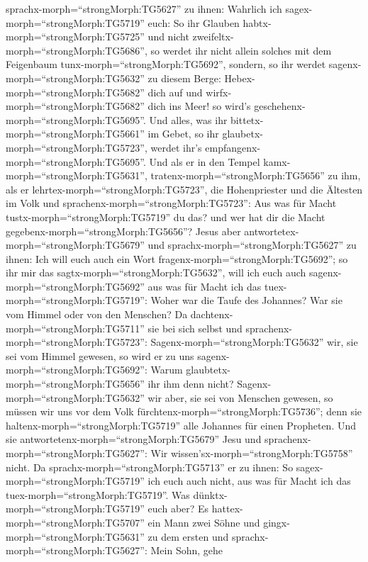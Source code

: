 sprachx-morph=``strongMorph:TG5627'' zu ihnen: Wahrlich ich
sagex-morph=``strongMorph:TG5719'' euch: So ihr Glauben
habtx-morph=``strongMorph:TG5725'' und nicht
zweifeltx-morph=``strongMorph:TG5686'', so werdet ihr nicht allein
solches mit dem Feigenbaum tunx-morph=``strongMorph:TG5692'', sondern,
so ihr werdet sagenx-morph=``strongMorph:TG5632'' zu diesem Berge:
Hebex-morph=``strongMorph:TG5682'' dich auf und
wirfx-morph=``strongMorph:TG5682'' dich ins Meer! so wird's
geschehenx-morph=``strongMorph:TG5695''.  Und alles, was
ihr bittetx-morph=``strongMorph:TG5661'' im Gebet, so ihr
glaubetx-morph=``strongMorph:TG5723'', werdet ihr's
empfangenx-morph=``strongMorph:TG5695''.  Und als er in den
Tempel kamx-morph=``strongMorph:TG5631'',
tratenx-morph=``strongMorph:TG5656'' zu ihm, als er
lehrtex-morph=``strongMorph:TG5723'', die Hohenpriester und die Ältesten
im Volk und sprachenx-morph=``strongMorph:TG5723'': Aus was für Macht
tustx-morph=``strongMorph:TG5719'' du das? und wer hat dir die Macht
gegebenx-morph=``strongMorph:TG5656''?  Jesus aber
antwortetex-morph=``strongMorph:TG5679'' und
sprachx-morph=``strongMorph:TG5627'' zu ihnen: Ich will euch auch ein
Wort fragenx-morph=``strongMorph:TG5692''; so ihr mir das
sagtx-morph=``strongMorph:TG5632'', will ich euch auch
sagenx-morph=``strongMorph:TG5692'' aus was für Macht ich das
tuex-morph=``strongMorph:TG5719'':  Woher war die Taufe des
Johannes? War sie vom Himmel oder von den Menschen? Da
dachtenx-morph=``strongMorph:TG5711'' sie bei sich selbst und
sprachenx-morph=``strongMorph:TG5723'':
Sagenx-morph=``strongMorph:TG5632'' wir, sie sei vom Himmel gewesen, so
wird er zu uns sagenx-morph=``strongMorph:TG5692'': Warum
glaubtetx-morph=``strongMorph:TG5656'' ihr ihm denn nicht? 
Sagenx-morph=``strongMorph:TG5632'' wir aber, sie sei von Menschen
gewesen, so müssen wir uns vor dem Volk
fürchtenx-morph=``strongMorph:TG5736''; denn sie
haltenx-morph=``strongMorph:TG5719'' alle Johannes für einen Propheten.
 Und sie antwortetenx-morph=``strongMorph:TG5679'' Jesu und
sprachenx-morph=``strongMorph:TG5627'': Wir
wissen'sx-morph=``strongMorph:TG5758'' nicht. Da
sprachx-morph=``strongMorph:TG5713'' er zu ihnen: So
sagex-morph=``strongMorph:TG5719'' ich euch auch nicht, aus was für
Macht ich das tuex-morph=``strongMorph:TG5719''.  Was
dünktx-morph=``strongMorph:TG5719'' euch aber? Es
hattex-morph=``strongMorph:TG5707'' ein Mann zwei Söhne und
gingx-morph=``strongMorph:TG5631'' zu dem ersten und
sprachx-morph=``strongMorph:TG5627'': Mein Sohn, gehe
